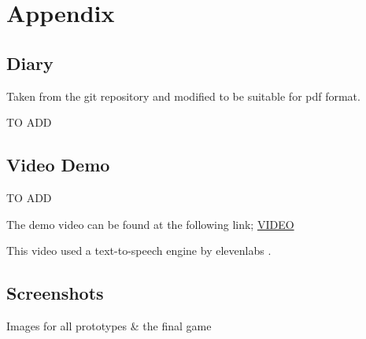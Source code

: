\documentclass[]{final}
\begin{document}







\chapter{Appendix}
\section{Diary}
Taken from the git repository and modified to be suitable for pdf format.

TO ADD

\section{Video Demo}
TO ADD

The demo video can be found at the following link; \href{}{VIDEO}

This video used a text-to-speech engine by elevenlabs \cite{noauthor_ai_nodate}.

\section{Screenshots}
Images for all prototypes \& the final game
\end{document}
